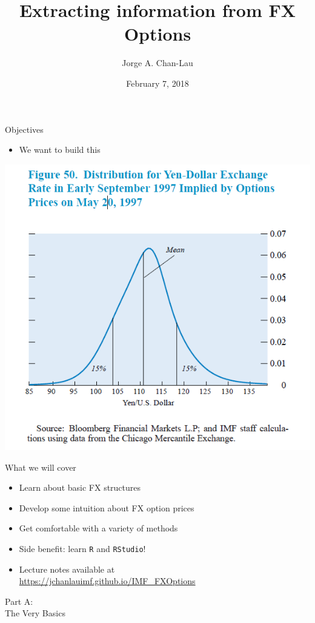 \documentclass[ignorenonframetext,aspectratio=169]{beamer}
\title{Extracting information from FX Options}
\author{Jorge A. Chan-Lau}
\date{February 7, 2018}
\providecommand{\tightlist}{%
  \setlength{\itemsep}{0pt}\setlength{\parskip}{0pt}}
\begin{document}
\frame{\titlepage}

\begin{frame}{Objectives}

\begin{itemize}
\tightlist
\item
  We want to build this
\end{itemize}

\begin{center}\includegraphics[width=0.6\linewidth]{images/figJPYRND} \end{center}

\end{frame}

\begin{frame}[fragile]{What we will cover}

\begin{itemize}
\tightlist
\item
  Learn about basic FX structures
\item
  Develop some intuition about FX option prices
\item
  Get comfortable with a variety of methods
\item
  Side benefit: learn \texttt{R} and \texttt{RStudio}!
\item
  Lecture notes available at\\
  \color{red} \url{https://jchanlauimf.github.io/IMF_FXOptions}
\end{itemize}

\end{frame}

\begin{frame}{}

\color{blue} \LARGE{Part A:}\\
\LARGE{The Very Basics}

\end{frame}
\end{document}
